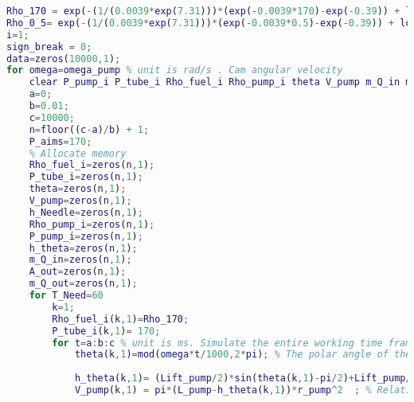 \documentclass[withoutpreface,bwprint]{cumcmthesis} %
\begin{document}
\begin{appendices}
\begin{lstlisting}[language=matlab]
Rho_170 = exp(-(1/(0.0039*exp(7.31)))*(exp(-0.0039*170)-exp(-0.39)) + log(0.85)); % Fuel density at a pressure of 160 MPa
Rho_0_5= exp(-(1/(0.0039*exp(7.31)))*(exp(-0.0039*0.5)-exp(-0.39)) + log(0.85)); % Fuel density at a pressure of 0.5 MPa
i=1;
sign_break = 0;
data=zeros(10000,1);
for omega=omega_pump % unit is rad/s . Cam angular velocity
    clear P_pump_i P_tube_i Rho_fuel_i Rho_pump_i theta V_pump m_Q_in m_Q_out h_Needle1 A_out1
    a=0;
    b=0.01;
    c=10000;
    n=floor((c-a)/b) + 1;
    P_aims=170;
    % Allocate memory
    Rho_fuel_i=zeros(n,1);
    P_tube_i=zeros(n,1);
    theta=zeros(n,1);
    V_pump=zeros(n,1);
    h_Needle=zeros(n,1);
    Rho_pump_i=zeros(n,1);
    P_pump_i=zeros(n,1);
    h_theta=zeros(n,1);
    m_Q_in=zeros(n,1);
    A_out=zeros(n,1);
    m_Q_out=zeros(n,1);
    for T_Need=60
        k=1;
        Rho_fuel_i(k,1)=Rho_170;
        P_tube_i(k,1)= 170;
        for t=a:b:c % unit is ms. Simulate the entire working time frame
            theta(k,1)=mod(omega*t/1000,2*pi); % The polar angle of the current moment cam. (unit is rad)
            
            h_theta(k,1)= (Lift_pump/2)*sin(theta(k,1)-pi/2)+Lift_pump/2;
            V_pump(k,1) = pi*(L_pump-h_theta(k,1))*r_pump^2  ; % Relationship between oil pump volume and pole diameter.


\end{lstlisting}
\end{appendices}
\end{document}
